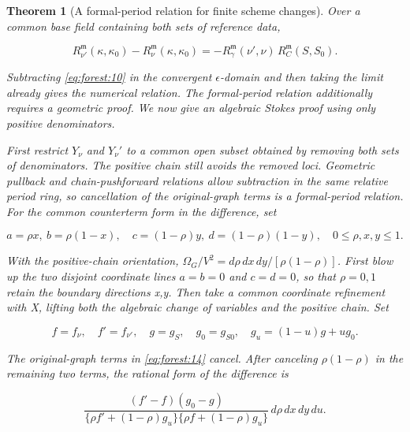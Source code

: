 \documentclass[11pt,a4paper,oneside]{article}
\theoremstyle{plain}
\newtheorem{theorem}{Theorem}[section]
\theoremstyle{definition}
\theoremstyle{remark}
\numberwithin{equation}{section}
\begin{document}
\begin{theorem}[A formal-period relation for finite scheme changes]

\label{thm:forest:6.1} Over a common base field containing both sets of reference data,

\begin{equation}
R_{\nu'}^{\mathfrak m}(\kappa,\kappa_0)
     -R_\nu^{\mathfrak m}(\kappa,\kappa_0)
       =-R_\gamma^{\mathfrak m}(\nu',\nu)\,
                         R_C^{\mathfrak m}(S,S_0).              \label{eq:forest:20}
\end{equation}

Subtracting \eqref{eq:forest:10} in the convergent \(\epsilon \)-domain and then taking the limit already gives the numerical relation. The formal-period relation additionally requires a geometric proof. We now give an algebraic Stokes proof using only positive denominators.

First restrict \(Y_\nu \) and \(Y_\nu '\) to a common open subset obtained by removing both sets of denominators. The positive chain still avoids the removed loci. Geometric pullback and chain-pushforward relations allow subtraction in the same relative period ring, so cancellation of the original-graph terms is a formal-period relation. For the common counterterm form in the difference, set

\begin{equation}
a=\rho x,\ b=\rho(1-x),\quad
 c=(1-\rho)y,\ d=(1-\rho)(1-y),\quad 0\le\rho,x,y\le1.
\end{equation}

With the positive-chain orientation, \(\Omega _G/V^{2}=d\rho \,dx\,dy/[\rho (1- \rho )]\). First blow up the two disjoint coordinate lines \({a=b=0}\) and \({c=d=0}\), so that \(\rho =0,1\) retain the boundary directions x,y. Then take a common coordinate refinement with X, lifting both the algebraic change of variables and the positive chain. Set

\begin{equation}
f=f_\nu,\quad f'=f_{\nu'},\quad g=g_S,\quad g_0=g_{S0},
 \quad g_u=(1-u)g+ug_0.
\end{equation}

The original-graph terms in \eqref{eq:forest:14} cancel. After canceling \(\rho (1- \rho )\) in the remaining two terms, the rational form of the difference is

\begin{equation}
\frac{(f'-f)(g_0-g)}
  {\{\rho f'+(1-\rho)g_u\}\{\rho f+(1-\rho)g_u\}}\,
                                 d\rho\,dx\,dy\,du.             \label{eq:forest:21}
\end{equation}


\end{theorem}
\end{document}
